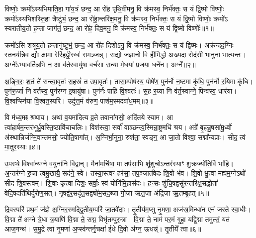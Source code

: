 \setcounter{anuvakam}{0}
विष्णोः॒ क्रमो᳚\-ऽस्यभिमाति॒हा गा॑य॒त्रं छन्द॒ आ रो॑ह पृथि॒वीमनु॒ वि क्र॑मस्व॒ निर्भ॑क्तः॒ स यं द्वि॒ष्मो विष्णोः॒ क्रमो᳚\-ऽस्यभिशस्ति॒हा त्रैष्टु॑भं॒ छन्द॒ आ रो॑हा॒न्तरि॑क्ष॒मनु॒ वि क्र॑मस्व॒ निर्भ॑क्तः॒ स यं द्वि॒ष्मो विष्णोः॒ क्रमो᳚\-ऽ स्यरातीय॒तो ह॒न्ता जाग॑तं॒ छन्द॒ आ रो॑ह॒ दिव॒मनु॒ वि क्र॑मस्व॒ निर्भ॑क्तः॒ स यं द्वि॒ष्मो विष्णोः᳚॥१॥

क्रमो॑\-ऽसि शत्रूय॒तो ह॒न्तानु॑ष्टुभं॒ छन्द॒ आ रो॑ह॒ दिशो\-ऽनु॒ वि क्र॑मस्व॒ निर्भ॑क्तः॒ स यं द्वि॒ष्मः। अक्र॑न्दद॒ग्निः स्त॒नय॑न्निव॒ द्यौः क्षामा॒ रेरि॑हद्वी॒रुधः॑ सम॒ञ्जन्न्। स॒द्यो ज॑ज्ञा॒नो वि हीमि॒द्धो अख्य॒दा रोद॑सी भा॒नुना॑ भात्य॒न्तः। अग्ने᳚\-ऽभ्यावर्तिन्न॒भि न॒ आ व॑र्त॒स्वायु॑षा॒ वर्च॑सा स॒न्या मे॒धया᳚ प्र॒जया॒ धने॑न। अग्ने᳚॥२॥

अ॒ङ्गि॒रः॒ श॒तं ते॑ सन्त्वा॒वृतः॑ स॒हस्रं॑ त उपा॒वृतः॑। तासा॒म्पोष॑स्य॒ पोषे॑ण॒ पुन॑र्नो न॒ष्टमा कृ॑धि॒ पुन॑र्नो र॒यिमा कृ॑धि। पुन॑रू॒र्जा नि व॑र्तस्व॒ पुन॑रग्न इ॒षायु॑षा। पुन॑र्नः पाहि वि॒श्वतः॑। स॒ह र॒य्या नि व॑र्त॒स्वाग्ने॒ पिन्व॑स्व॒ धार॑या। वि॒श्वप्स्नि॑या वि॒श्वत॒स्परि॑। उदु॑त्त॒मं व॑रुण॒ पाश॑म॒स्मदवा॑ध॒मम्॥३॥

वि म॑ध्य॒मꣴ श्र॑थाय। अथा॑ व॒यमा॑दित्य व्र॒ते तवाना॑गसो॒ अदि॑तये स्याम। आ त्वा॑हार्\mbox{}षम॒न्तर॑भूर्ध्रु॒वस्ति॒ष्ठा\-वि॑चाचलिः। विश॑स्त्वा॒ सर्वा॑ वाञ्छन्त्व॒स्मिन्रा॒ष्ट्रमधि॑ श्रय। अग्रे॑ बृ॒हन्नु॒षसा॑मू॒र्ध्वो अ॑स्थान्निर्जग्मि॒वान्तम॑सो॒ ज्योति॒षागा᳚त्। अ॒ग्निर्भा॒नुना॒ रुश॑ता॒ स्वङ्ग॒ आ जा॒तो विश्वा॒ सद्मा᳚न्यप्राः। सीद॒ त्वं मा॒तुर॒स्याः॥४॥

उ॒पस्थे॒ विश्वा᳚न्यग्ने व॒युना॑नि वि॒द्वान्। मैना॑म॒र्चिषा॒ मा तप॑सा॒भि शू॑शुचो॒\-ऽन्तर॑स्याꣳ शु॒क्रज्यो॑ति॒र्वि भा॑हि। अ॒न्तर॑ग्ने रु॒चा त्वमु॒खायै॒ सद॑ने॒ स्वे। तस्या॒स्त्वꣳ हर॑सा॒ तप॒ञ्जात॑वेदः शि॒वो भ॑व। शि॒वो भू॒त्वा मह्य॑म॒ग्ने\-ऽथो॑ सीद शि॒वस्त्वम्। शि॒वाः कृ॒त्वा दिशः॒ सर्वाः॒ स्वं योनि॑मि॒हास॑दः। ह॒ꣳ॒सः शु॑चि॒षद्वसु॑रन्तरिक्ष॒सद्धोता॑ वेदि॒षदति॑थिर्दुरोण॒सत्। नृ॒षद्व॑र॒सदृ॑त॒सद्व्यो॑म॒सद॒ब्जा गो॒जा ऋ॑त॒जा अ॑द्रि॒जा ऋ॒तम्बृ॒हत्॥५॥

{\anuvakamend[{दिव॒मनु॒ वि क्र॑मस्व॒ निर्भ॑क्तः॒ स यं द्वि॒ष्मो विष्णो॒र्धने॒नाग्ने॑\-ऽध॒मम॒स्याः शु॑चि॒षथ्षोड॑श च॥१॥}]}

दि॒वस्परि॑ प्रथ॒मं ज॑ज्ञे अ॒ग्निर॒स्मद्द्वि॒तीय॒म्परि॑ जा॒तवे॑दाः। तृ॒तीय॑म॒प्सु नृ॒मणा॒ अज॑स्र॒मिन्धा॑न एनं जरते स्वा॒धीः। वि॒द्मा ते॑ अग्ने त्रे॒धा त्र॒याणि॑ वि॒द्मा ते॒ सद्म॒ विभृ॑तम्पुरु॒त्रा। वि॒द्मा ते॒ नाम॑ पर॒मं गुहा॒ यद्वि॒द्मा तमुत्सं॒ यत॑ आज॒गन्थ॑। स॒मु॒द्रे त्वा॑ नृ॒मणा॑ अ॒प्स्व॑न्तर्नृ॒चक्षा॑ ईधे दि॒वो अ॑ग्न॒ ऊधन्न्॑। तृ॒तीये᳚ त्वा॥६॥

